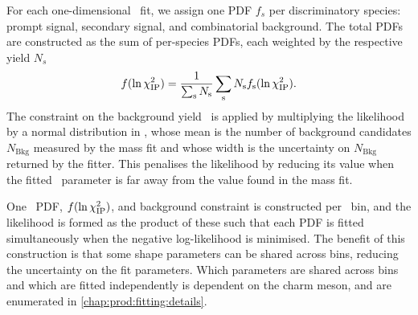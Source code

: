 For each one-dimensional \lnipchisq\ fit, we assign one \ac{PDF} $f_{s}$ per 
discriminatory species: prompt signal, secondary signal, and combinatorial 
background.
The total \acp{PDF} are constructed as the sum of per-species \acp{PDF}, 
each weighted by the respective yield $N_{s}$
\begin{equation}
  f(\ln\chi^2_{\textnormal{IP}}) = \frac{1}{\sum_{\textnormal{s}} N_{\textnormal{s}}}
                  \sum_{\text{s}} N_{\text{s}}
                  f_{\text{s}}(\ln\chi^2_{\textnormal{IP}}).
\end{equation}
The constraint on the background yield \nbkg\ is applied by multiplying the 
likelihood by a normal distribution in \nbkg, whose mean is the number of 
background candidates $N_{\text{Bkg}}$ measured by the mass fit and whose width 
is the uncertainty on $N_{\text{Bkg}}$ returned by the fitter.
This penalises the likelihood by reducing its value when the fitted \nbkg\ 
parameter is far away from the value found in the mass fit.

One \lnipchisq\ \ac{PDF}, $f(\ln\chi^2_{\textnormal{IP}})$, and background constraint is 
constructed per \pTy\ bin, and the likelihood is formed as the product of these 
such that each \ac{PDF} is fitted simultaneously when the negative 
log-likelihood is minimised.
The benefit of this construction is that some shape parameters can be shared 
across bins, reducing the uncertainty on the fit parameters.
Which parameters are shared across bins and which are fitted independently is 
dependent on the charm meson, and are enumerated in 
\cref{chap:prod:fitting:details}.

